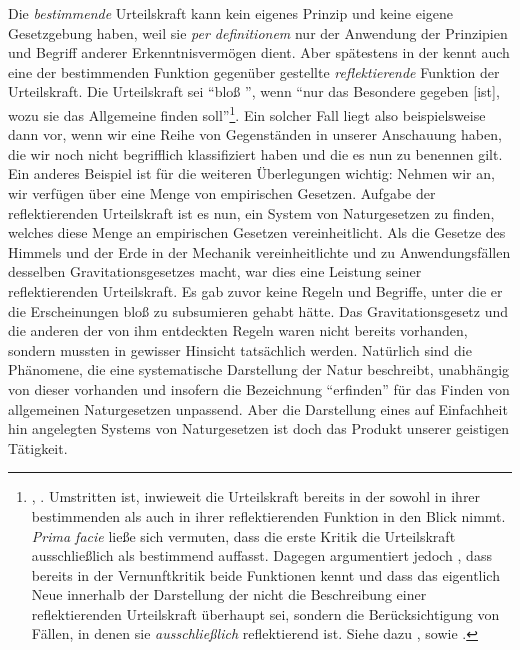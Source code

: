 \begin{nummerierung}
Die \emph{bestimmende} Urteilskraft kann kein eigenes Prinzip und keine eigene
Gesetzgebung haben, weil sie \emph{per definitionem} nur der Anwendung der
Prinzipien und Begriff anderer Erkenntnisvermögen dient. Aber spätestens in der
 kennt  auch eine der
bestimmenden Funktion gegenüber gestellte \emph{reflektierende} Funktion der
Urteilskraft. Die Urteilskraft sei
\enquote{bloß }, wenn \enquote{nur das Besondere gegeben
[ist], wozu sie das Allgemeine finden
soll}\footnote{\cite[][B xxvi]{Kant:KritikderUrteilskraft2009},
\cite[][V: 179.24--25]{Kant:GesammelteWerke1900ff.}. Umstritten ist, inwieweit
 die Urteilskraft bereits in der  sowohl in ihrer bestimmenden als auch in ihrer reflektierenden
Funktion in den Blick nimmt. \emph{Prima facie} ließe sich vermuten, dass die
erste Kritik die Urteilskraft ausschließlich als bestimmend auffasst. Dagegen
argumentiert jedoch ,
dass  bereits in der Vernunftkritik beide Funktionen kennt
und dass das eigentlich Neue innerhalb der Darstellung der  nicht die Beschreibung einer reflektierenden Urteilskraft
überhaupt sei, sondern die Berücksichtigung von Fällen, in denen sie
\emph{ausschließlich} reflektierend ist. Siehe dazu
\cite[][163--166]{Longuenesse:KantandtheCapacitytoJudge1998}, sowie
\cite[][16]{Allison:KantsTheoryofTaste2001}.}. Ein solcher Fall liegt also
beispielsweise dann vor, wenn wir eine Reihe von Gegenständen in unserer
Anschauung haben, die wir noch nicht begrifflich klassifiziert haben und die es
nun zu benennen gilt. Ein anderes Beispiel ist für die weiteren Überlegungen
wichtig: Nehmen wir an, wir verfügen über eine Menge von empirischen Gesetzen.
Aufgabe der reflektierenden Urteilskraft ist es nun, ein System von
Naturgesetzen zu finden, welches diese Menge an empirischen Gesetzen
vereinheitlicht. Als  die Gesetze des Himmels und der Erde
in der Mechanik vereinheitlichte und zu Anwendungsfällen desselben
Gravitationsgesetzes macht, war dies eine Leistung seiner reflektierenden
Urteilskraft. Es gab zuvor keine Regeln und Begriffe, unter die er die
Erscheinungen bloß zu subsumieren gehabt hätte. Das Gravitationsgesetz und die
anderen der von ihm entdeckten Regeln waren nicht bereits vorhanden, sondern
mussten in gewisser Hinsicht tatsächlich  werden.
Natürlich sind die Phänomene, die eine systematische Darstellung der Natur
beschreibt, unabhängig von dieser vorhanden und insofern die Bezeichnung
\enquote{erfinden} für das Finden von allgemeinen Naturgesetzen unpassend. Aber die Darstellung eines
auf Einfachheit hin angelegten Systems von Naturgesetzen ist doch das Produkt
unserer geistigen Tätigkeit.


\end{nummerierung}
